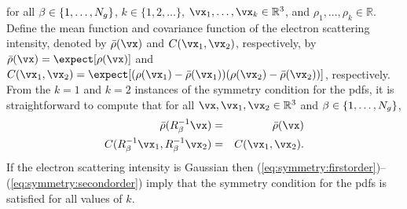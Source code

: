 for all $\beta\in\{1,\dots,N_g\}$, $k\in\{1,2,\dots\}$,
$\vx_1,\dots,\vx_k\in\mathbb{R}^3$, and $\rho_1,\dots,\rho_k\in\mathbb{R}$.
Define the mean function and covariance function of the electron scattering
intensity, denoted by $\bar\rho(\vx)$ and $\CrhoREAL(\vx_1,\vx_2)$,
respectively, by $\bar\rho(\vx)=\expect[\rho(\vx)]$ and
$\CrhoREAL(\vx_1,\vx_2)=\expect[(\rho(\vx_1)-\bar\rho(\vx_1))(\rho(\vx_2)-\bar\rho(\vx_2))]$,
respectively.
From the $k=1$ and $k=2$ instances of the symmetry condition for the pdfs,
it is straightforward to compute that for all
$\vx,\vx_1,\vx_2\in\mathbb{R}^{3}$ and $\beta\in\{1,\dots,N_g\}$,
\begin{eqnarray}
\bar\rho(R_\beta^{-1} \vx)
&=&
\bar\rho(\vx)
\label{eq:symmetry:firstorder}
\\
\CrhoREAL(R_\beta^{-1} \vx_1, R_\beta^{-1} \vx_2)
&=&
\CrhoREAL(\vx_1,\vx_2)
\label{eq:symmetry:secondorder}
.
\end{eqnarray}
If the electron scattering intensity is Gaussian then
(\ref{eq:symmetry:firstorder})--(\ref{eq:symmetry:secondorder})
imply that the
symmetry condition for the pdfs is satisfied for all values of $k$.
